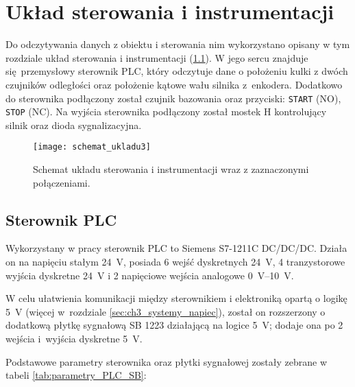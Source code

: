 \chapter{Układ sterowania i instrumentacji}
\label{cha:ch3_uklad_ster_i_instrumentacji}

Do odczytywania danych z obiektu i sterowania nim wykorzystano opisany w tym rozdziale układ sterowania i instrumentacji (\cref{fig:schemat_ukl_sterowania_instrumentacji}). W jego sercu znajduje się przemysłowy sterownik PLC, który odczytuje dane o położeniu kulki z dwóch czujników odległości oraz położenie kątowe wału silnika z~enkodera. Dodatkowo do sterownika podłączony został czujnik bazowania oraz przyciski: \texttt{START} (NO), \texttt{STOP} (NC). Na wyjścia sterownika podłączony został mostek H kontrolujący silnik oraz dioda sygnalizacyjna.


\begin{figure}[H]
    \centering
    \texttt{[image: schemat\_ukladu3]}
    \caption{Schemat układu sterowania i instrumentacji wraz z zaznaczonymi połączeniami.}
    \label{fig:schemat_ukl_sterowania_instrumentacji}
\end{figure}

\section{Sterownik PLC}
\label{sec:ch3_PLC}

Wykorzystany w pracy sterownik PLC to Siemens S7-1211C DC/DC/DC. Działa on na napięciu stałym \SI{24}{V}, posiada 6 wejść dyskretnych \SI{24}{V}, 4 tranzystorowe wyjścia dyskretne \SI{24}{V} i 2 napięciowe wejścia analogowe \SIrange{0}{10}{V}.

W celu ułatwienia komunikacji między sterownikiem i elektroniką opartą o logikę \SI{5}{V} (więcej w~rozdziale \ref{sec:ch3_systemy_napiec}), został on rozszerzony o dodatkową płytkę sygnałową SB 1223 działającą na logice \SI{5}{V}; dodaje ona po 2 wejścia i~wyjścia dyskretne \SI{5}{V}.

Podstawowe parametry sterownika oraz płytki sygnałowej zostały zebrane w tabeli \ref{tab:parametry_PLC_SB}:

